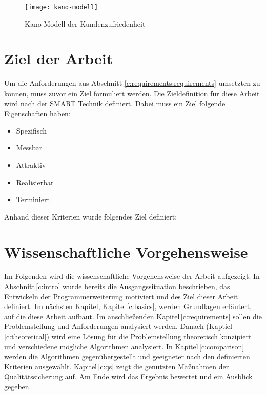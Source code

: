 \begin{figure}[h]
	\centering
	\texttt{[image: kano-modell]}
	\caption[Kano Modells]{Kano Modell der Kundenzufriedenheit}
	\label{fig:kano-model}
\end{figure}

\section{Ziel der Arbeit}
\label{c:intro:target}
Um die Anforderungen aus Abschnitt \ref{c:requirements:requirements} umsetzten zu können, muss zuvor ein Ziel formuliert werden.
Die Zieldefinition für diese Arbeit wird nach der SMART Technik definiert. Dabei muss ein Ziel folgende Eigenschaften haben:

\begin{itemize}
	\item Spezifisch
	\item Messbar
	\item Attraktiv
	\item Realisierbar
	\item Terminiert
\end{itemize}

Anhand dieser Kriterien wurde folgendes Ziel definiert:



\section{Wissenschaftliche Vorgehensweise}
\label{c:intro:methodology:scientific_proceture}
Im Folgenden wird die wissenschaftliche Vorgehensweise der Arbeit aufgezeigt.
In Abschnitt\,\ref{c:intro} wurde bereits die Ausgangssituation beschrieben, das Entwickeln der Programmerweiterung motiviert und des Ziel dieser Arbeit definiert. Im nächsten Kapitel, Kapitel\,\ref{c:basics}, werden Grundlagen erläutert, auf die diese Arbeit aufbaut. Im anschließenden Kapitel\,\ref{c:requirements} sollen die Problemstellung und Anforderungen analysiert werden. Danach (Kaptiel\,\ref{c:theoretical}) wird eine Lösung für die Problemstellung theoretisch konzipiert und verschiedene mögliche Algorithmen analysiert. In Kapitel\,\ref{c:comparison} werden die Algorithmen gegenübergestellt und geeigneter nach den definierten Kriterien ausgewählt. Kapitel\,\ref{c:qs} zeigt die genutzten Maßnahmen der Qualitätssicherung auf. Am Ende wird das Ergebnis bewertet und ein Ausblick gegeben.

